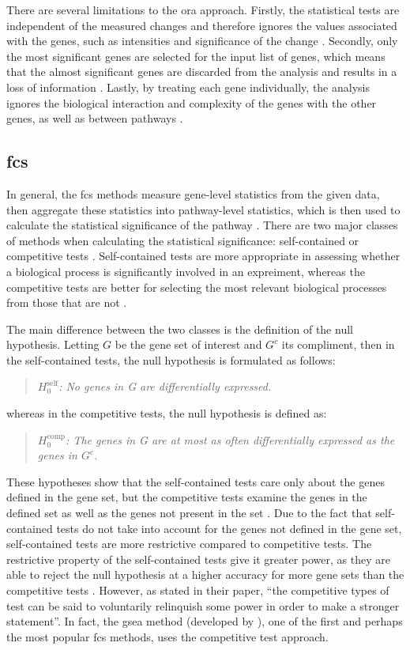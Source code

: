 There are several limitations to the \gls{ora} approach.
Firstly, the statistical tests are independent of the measured changes and therefore ignores the values associated with the genes, such as intensities and significance of the change \citep{Khatri2012}.
Secondly, only the most significant genes are selected for the input list of genes, which means that the almost significant genes are discarded from the analysis and results in a loss of information \citep{Khatri2012}.
Lastly, by treating each gene individually, the analysis ignores the biological interaction and complexity of the genes with the other genes, as well as between pathways \citep{Khatri2012}.

\subsection{\Gls{fcs}}
\label{ssub:fcs}

In general, the \gls{fcs} methods measure gene-level statistics from the given data, then aggregate these statistics into pathway-level statistics, which is then used to calculate the statistical significance of the pathway \citep{Khatri2012}.
There are two major classes of methods when calculating the statistical significance: self-contained or competitive tests \citep{Goeman2007}.
Self-contained tests are more appropriate in assessing whether a biological process is significantly involved in an expreiment, whereas the competitive tests are better for selecting the most relevant biological processes from those that are not \citep{Wu2012}.

The main difference between the two classes is the definition of the null hypothesis.
Letting $G$ be the gene set of interest and $G^c$ its compliment, then in the self-contained tests, the null hypothesis is formulated as follows:
\begin{quote}
	\textit{$H_0^{\textrm{self}}$: No genes in G are differentially expressed. }
\end{quote}
whereas in the competitive tests, the null hypothesis is defined as:
\begin{quote}
	\textit{$H_0^{\textrm{comp}}$: The genes in G are at most as often differentially expressed as the genes in $G^c$.
	}
\end{quote}
These hypotheses show that the self-contained tests care only about the genes defined in the gene set, but the competitive tests examine the genes in the defined set as well as the genes not present in the set \citep{Wu2012}.
Due to the fact that self-contained tests do not take into account for the genes not defined in the gene set, self-contained tests are more restrictive compared to competitive tests.
The restrictive property of the self-contained tests give it greater power, as they are able to reject the null hypothesis at a higher accuracy for more gene sets than the competitive tests \citep{Goeman2007}.
However, as \citet{Goeman2007} stated in their paper, ``the competitive types of test can be said to voluntarily relinquish some power in order to make a stronger statement''.
In fact, the \gls{gsea} method (developed by \citet{Subramanian2005}), one of the first and perhaps the most popular \gls{fcs} methods, uses the competitive test approach.

